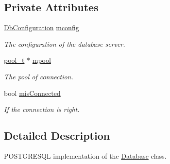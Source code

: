 \subsection*{Private Attributes}
\begin{DoxyCompactItemize}
\item 
\hypertarget{classPOSTGREDatabase_a83b42bf33f2daccada9d726d8100b3e5}{
\hyperlink{classDbConfiguration}{DbConfiguration} \hyperlink{classPOSTGREDatabase_a83b42bf33f2daccada9d726d8100b3e5}{mconfig}}
\label{classPOSTGREDatabase_a83b42bf33f2daccada9d726d8100b3e5}

\begin{DoxyCompactList}\small\item\em The configuration of the database server. \item\end{DoxyCompactList}\item 
\hypertarget{classPOSTGREDatabase_a85ab525b03e95ac8871bcc9d5601f641}{
\hyperlink{structPOSTGREDatabase_1_1pool__t}{pool\_\-t} $\ast$ \hyperlink{classPOSTGREDatabase_a85ab525b03e95ac8871bcc9d5601f641}{mpool}}
\label{classPOSTGREDatabase_a85ab525b03e95ac8871bcc9d5601f641}

\begin{DoxyCompactList}\small\item\em The pool of connection. \item\end{DoxyCompactList}\item 
\hypertarget{classPOSTGREDatabase_aa4f59d325b41b9b328878323c9589ac4}{
bool \hyperlink{classPOSTGREDatabase_aa4f59d325b41b9b328878323c9589ac4}{misConnected}}
\label{classPOSTGREDatabase_aa4f59d325b41b9b328878323c9589ac4}

\begin{DoxyCompactList}\small\item\em If the connection is right. \item\end{DoxyCompactList}\end{DoxyCompactItemize}


\subsection{Detailed Description}
POSTGRESQL implementation of the \hyperlink{classDatabase}{Database} class. 

